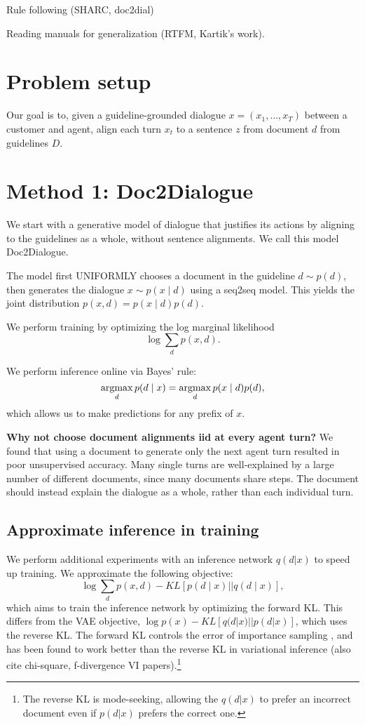 \documentclass[11pt]{article}
\begin{document}
Rule following (SHARC, doc2dial)

Reading manuals for generalization (RTFM, Kartik's work).

\section{Problem setup}
Our goal is to, given a guideline-grounded dialogue $x = (x_1,\ldots,x_T)$
between a customer and agent,
align each turn $x_t$ to a sentence $z$ from document $d$ from guidelines $D$.


\section{Method 1: Doc2Dialogue}
We start with a generative model of dialogue that justifies its actions by
aligning to the guidelines as a whole, without sentence alignments.
We call this model Doc2Dialogue.

The model first UNIFORMLY chooses a document in the guideline $d \sim p(d)$,
then generates the dialogue $x \sim p(x \mid d)$ using a seq2seq model.
This yields the joint distribution $p(x,d) = p(x\mid d)p(d)$.

We perform training by optimizing the log marginal likelihood
\begin{equation}
\log\sum_d p(x,d).
\end{equation}

We perform inference online via Bayes' rule:
\begin{equation}
\operatorname*{argmax}_d p(d\mid x) = \operatorname*{argmax}_d p(x\mid d)p(d),
\end{equation}
which allows us to make predictions for any prefix of $x$.

\textbf{Why not choose document alignments iid at every agent turn?}
We found that using a document to generate only the next agent turn resulted in poor
unsupervised accuracy.
Many single turns are well-explained by a large number of different documents,
since many documents share steps.
The document should instead explain the dialogue as a whole, rather than each individual turn.

\subsection{Approximate inference in training}
We perform additional experiments with an inference network $q(d|x)$ to speed up training.
We approximate the following objective:
\begin{equation}
\label{eqn:fkl}
\log\sum_d p(x,d) - KL[p(d\mid x) || q(d \mid x)],
\end{equation}
which aims to train the inference network by optimizing the forward KL.
This differs from the VAE objective,
$\log p(x) - KL[q(d|x) || p(d|x)]$,
which uses the reverse KL.
The forward KL controls the error of importance sampling \cite{chatterjee},
and has been found to work better than the reverse KL in variational inference \cite{fkl}
(also cite chi-square, f-divergence VI papers).\footnote{
The reverse KL is mode-seeking,
allowing the $q(d|x)$ to prefer an incorrect document
even if $p(d|x)$ prefers the correct one.
}
\end{document}
